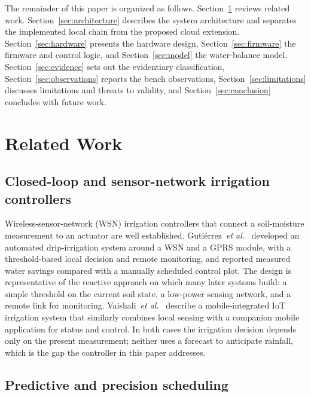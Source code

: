 \documentclass[conference]{IEEEtran}
\begin{document}
The remainder of this paper is organized as follows. Section~\ref{sec:related}
reviews related work. Section~\ref{sec:architecture} describes the system
architecture and separates the implemented local chain from the proposed cloud
extension. Section~\ref{sec:hardware} presents the hardware design,
Section~\ref{sec:firmware} the firmware and control logic, and
Section~\ref{sec:model} the water-balance model.
Section~\ref{sec:evidence} sets out the evidentiary classification,
Section~\ref{sec:observations} reports the bench observations,
Section~\ref{sec:limitations} discusses limitations and threats to validity,
and Section~\ref{sec:conclusion} concludes with future work.

\section{Related Work}
\label{sec:related}

\subsection{Closed-loop and sensor-network irrigation controllers}

Wireless-sensor-network (WSN) irrigation controllers that connect a
soil-moisture measurement to an actuator are well established.
Guti\'{e}rrez~\emph{et al.}~\cite{gutierrez2014automated} developed an
automated drip-irrigation system around a WSN and a GPRS module, with a
threshold-based local decision and remote monitoring, and reported measured
water savings compared with a manually scheduled control plot. The design is
representative of the reactive approach on which many later systems build: a
simple threshold on the current soil state, a low-power sensing network, and a
remote link for monitoring. Vaishali~\emph{et al.}~\cite{vaishali2017mobile}
describe a mobile-integrated IoT irrigation system that similarly combines
local sensing with a companion mobile application for status and control.
In both cases the irrigation decision depends only on the present
measurement; neither uses a forecast to anticipate rainfall, which is the
gap the controller in this paper addresses.

\subsection{Predictive and precision scheduling}
\end{document}
